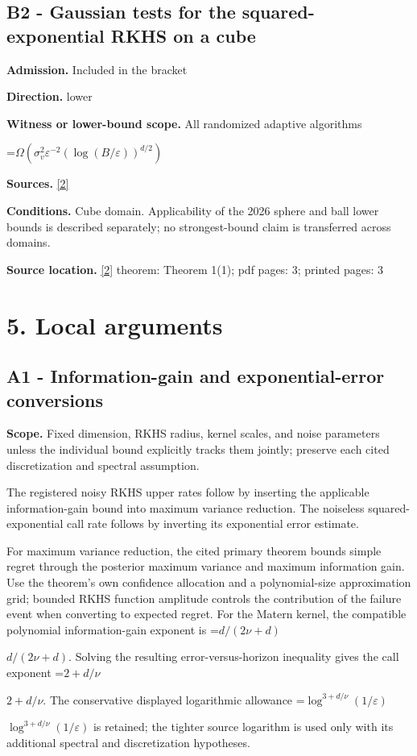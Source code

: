 \documentclass[10pt,a4paper]{article}
\newcommand{\AtlasMath}[1]{\par\begingroup\centering\setbox0=\hbox{$\displaystyle #1$}\ifdim\wd0>1.4\linewidth\typeout{ATLAS WIDE FORMULA: \the\wd0}\fi\ifdim\wd0>\linewidth\resizebox{\linewidth}{!}{\box0}\else\box0\fi\par\endgroup}
\newcommand{\AtlasInlineMath}[1]{\begingroup\setbox0=\hbox{$#1$}\ifdim\wd0>.4\linewidth\endgroup\AtlasMath{#1}\else\endgroup$#1$\fi}
\begin{document}
\subsection{B2 - Gaussian tests for the squared-exponential RKHS on a cube}
\textbf{Admission.} Included in the bracket

\textbf{Direction.} lower

\textbf{Witness or lower-bound scope.} All randomized adaptive algorithms

\AtlasMath{\Omega\!\left(\sigma_v^2\varepsilon^{-2}(\log(B/\varepsilon))^{d/2}\right)}
\textbf{Sources.} \href{https://proceedings.mlr.press/v65/scarlett17a/scarlett17a.pdf}{[2]}

\textbf{Conditions.} Cube domain. Applicability of the 2026 sphere and ball lower bounds is described separately; no strongest-bound claim is transferred across domains.

\textbf{Source location.} \href{https://proceedings.mlr.press/v65/scarlett17a/scarlett17a.pdf}{[2]} theorem: Theorem 1(1); pdf pages: 3; printed pages: 3

\section{5. Local arguments}
\subsection{A1 - Information-gain and exponential-error conversions}
\textbf{Scope.} Fixed dimension, RKHS radius, kernel scales, and noise parameters unless the individual bound explicitly tracks them jointly; preserve each cited discretization and spectral assumption.

The registered noisy RKHS upper rates follow by inserting the applicable information-gain bound into maximum variance reduction. The noiseless squared-exponential call rate follows by inverting its exponential error estimate.

For maximum variance reduction, the cited primary theorem bounds simple regret through the posterior maximum variance and maximum information gain. Use the theorem's own confidence allocation and a polynomial-size approximation grid; bounded RKHS function amplitude controls the contribution of the failure event when converting to expected regret. For the Matern kernel, the compatible polynomial information-gain exponent is \AtlasInlineMath{d/(2\nu+d)}. Solving the resulting error-versus-horizon inequality gives the call exponent \AtlasInlineMath{2+d/\nu}. The conservative displayed logarithmic allowance \AtlasInlineMath{\log^{3+d/\nu}(1/\varepsilon)} is retained; the tighter source logarithm is used only with its additional spectral and discretization hypotheses.
\end{document}
